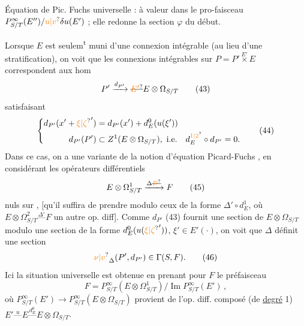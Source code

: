 Équation de Pic. Fuchs universelle : à valeur dans le pro-faisceau $P^\infty_{S/T}(E'')/\unsure{u|v}\delta u(E')$ ; elle redonne la section $\varphi$ du début.

Lorsque $E$ est seulem\textsuperscript{t} muni d'une connexion intégrable   (au lieu d'une stratification), on voit que les connexions intégrables sur $P=P'\mathbin{\overset{E'}{\times}}E$ correspondent aux hom
\[
 P'\xrightarrow{d_{P'}}\deleted{\unsure{E'}}E\otimes\Omega_{S/T} \tag*{(43)}
\]
satisfaisant
\[
 \left\{\begin{aligned}
 d_{P'}(x'+{\unsure{\xi|\zeta}}')&=d_{P'}(x')+d^0_E(u(\xi'))\\
 d_{P'}(P')&\subset Z^1(E\otimes\Omega_{S/T}),\ \text{i.e.}\quad d^{\unsure{1|2}}_E\circ d_{P'}=0 .
 \end{aligned}\right. \tag*{(44)}
\]
Dans ce cas, on a une variante de la notion d'équation  Picard-Fuchs , en considérant les opérateurs différentiels
\[
 E\otimes\Omega^1_{S/T}\xrightarrow{\Delta\deleted{\unsure{D}}}F \tag*{(45)}
\]
nuls sur  ,  [qu'il suffira de prendre modulo ceux de la forme $\Delta'\circ d^1_E$,  où  $E\otimes\Omega^2_{S/T}\mathrel{\overset{\Delta'}{\text{---}}}F$ un autre op. diff]. Comme $d_{P'}$ (43) fournit  une section de $E\otimes\Omega_{S/T}$ modulo une section
de la forme $d^0_E(u({\unsure{\xi|\zeta}}'))$, $\xi'\in E'(\cdot)$, on voit que $\Delta$ définit une section
\[
 \unsure{\nu|v}_\Delta(P',d_{P'})\in\Gamma(S,F). \tag*{(46)}
\]
Ici la situation universelle est obtenue en prenant pour $F$ le préfaisceau
\[
 F=P^\infty_{S/T}(E\otimes\Omega^{1}_{S/T})/\operatorname{Im}P^\infty_{S/T}(E')\,,
\]
où $P^\infty_{S/T}(E')\longrightarrow P^\infty_{S/T}(E\otimes\Omega_{S/T})$ provient de l'op. diff. composé (de \uline{degré} 1)  $E'\mathrel{\overset{u}{\text{---}}}E\mathrel{\overset{d^0_E}{\text{---}}}E\otimes\Omega_{S/T}$.


